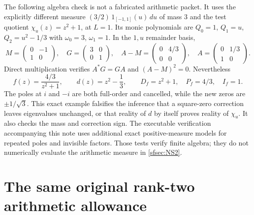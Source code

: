 \documentclass[11pt]{article}
\begin{document}
The following algebra check is not a fabricated arithmetic
packet. It uses the explicitly different measure
$(3/2)\,1_{[-1,1]}(u)\,du$ of mass $3$ and the test quotient
$\chi_u(z)=z^2+1$, at $L=1$. Its monic polynomials are
$Q_0=1$, $Q_1=u$, $Q_2=u^2-1/3$ with
$\omega_0=3$, $\omega_1=1$. In the $1,u$ remainder basis,
\begin{equation}\tag{NS33}\label{sfsec:NS33}
M=\begin{pmatrix}0&-1\\1&0\end{pmatrix},\quad
G=\begin{pmatrix}3&0\\0&1\end{pmatrix},\quad
A-M=\begin{pmatrix}0&4/3\\0&0\end{pmatrix},\quad
A=\begin{pmatrix}0&1/3\\1&0\end{pmatrix}.
\end{equation}
Direct multiplication verifies $A^*G=GA$ and
$(A-M)^2=0$. Nevertheless
\begin{equation}\tag{NS34}\label{sfsec:NS34}
f(z)=\frac{4/3}{z^2+1},\qquad
d(z)=z^2-\frac13,\qquad
D_f=z^2+1,\quad P_f=4/3,\quad I_f=1.
\end{equation}
The poles at $i$ and $-i$ are both full-order and
cancelled, while the new zeros are $\pm1/\sqrt3$.
This exact example falsifies the inference that a
square-zero correction leaves eigenvalues unchanged,
or that reality of $d$ by itself proves reality of
$\chi_u$. It also checks the mass and correction sign.
The executable verification accompanying this note
uses additional exact positive-measure models for
repeated poles and invisible factors. Those tests
verify finite algebra; they do not numerically
evaluate the arithmetic measure in \eqref{sfsec:NS2}.

\section{The same original rank-two arithmetic allowance}
\end{document}
